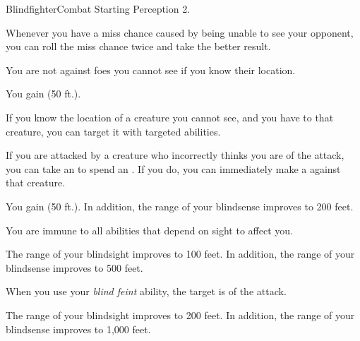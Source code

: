     \begin{feat}{Blindfighter}{Combat}
        \featpre Starting Perception 2.
        \featben
        
         Whenever you have a miss chance caused by being unable to see your opponent, you can roll the miss chance twice and take the better result.

         You are not  against foes you cannot see if you know their location.

         You gain  (50 ft.).

         If you know the location of a creature you cannot see, and you have  to that creature, you can target it with targeted abilities.

         If you are attacked by a creature who incorrectly thinks you are  of the attack, you can take an  to spend an .
        If you do, you can immediately make a  against that creature.

         You gain  (50 ft.).
        In addition, the range of your blindsense improves to 200 feet. 

         You are immune to all abilities that depend on sight to affect you.

         The range of your blindsight improves to 100 feet.
        In addition, the range of your blindsense improves to 500 feet.

         When you use your \textit{blind feint} ability, the target is  of the attack.

         The range of your blindsight improves to 200 feet.
        In addition, the range of your blindsense improves to 1,000 feet.
    \end{feat}

